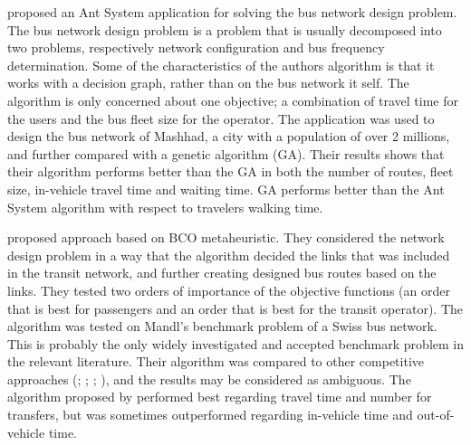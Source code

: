 \citet{poorzahedy11} proposed an Ant System application for solving the bus network design problem. The bus network design problem is a problem that is usually decomposed into two problems, respectively network configuration and bus frequency determination. Some of the characteristics of the authors algorithm is that it works with a decision graph, rather than on the bus network it self. The algorithm is only concerned about one objective; a combination of travel time for the users and the bus fleet size for the operator. The application was used to design the bus network of Mashhad, a city with a population of over 2 millions, and further compared with a genetic algorithm (GA). Their results shows that their algorithm performs better than the GA in both the number of routes, fleet size, in-vehicle travel time and waiting time. GA performs better than the Ant System algorithm with respect to travelers walking time. 

\citet{nikolic14} proposed approach based on BCO metaheuristic. They considered the network design problem in a way that the algorithm decided the links that was included in the transit network, and further creating designed bus routes based on the links. They tested two orders of importance of the objective functions (an order that is best for passengers and an order that is best for the transit operator). The algorithm was tested on Mandl's benchmark problem of a Swiss bus network\citep{mandl80}. This is probably the only widely investigated and accepted benchmark problem in the relevant literature\citep{kechagiopoulos14}. Their algorithm was compared to other competitive approaches (\citet{mandl80}; \citet{shih94}; \citet{baaj95}; \citet{bagloee11}), and the results may be considered as ambiguous. The algorithm proposed by \citet{nikolic14} performed best regarding travel time and number for transfers, but was sometimes outperformed regarding in-vehicle time and out-of-vehicle time. 

